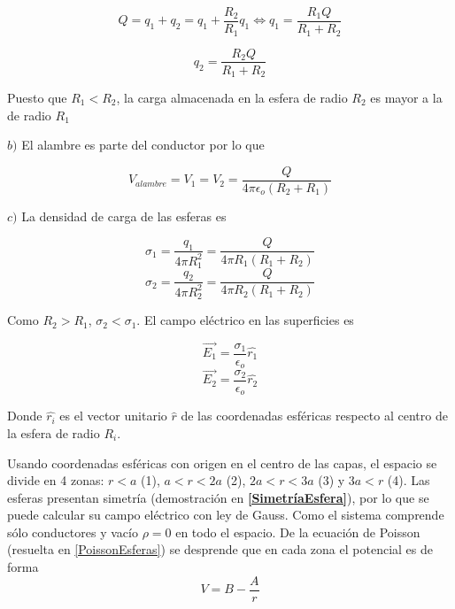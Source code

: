 \[Q = q_1 + q_2 = q_1 + \frac{R_2}{R_1}q_1 \Leftrightarrow
q_1 = \frac{R_1 Q}{R_1+R_2}\]

\[q_2 = \frac{R_2 Q}{R_1+R_2}\]

Puesto que $R_1<R_2$, la carga almacenada en la esfera de radio $R_2$ es mayor a la de radio $R_1$

\bigbreak

$b)$ El alambre es parte del conductor por lo que

\[V_{alambre} = V_1 = V_2 = \frac{Q}{4\pi\epsilon_o(R_2+R_1)}\]
\bigbreak

$c)$ La densidad de carga de las esferas es

\[\sigma_1 = \frac{q_1}{4\pi R_1^2} =
\frac{Q}{4\pi R_1(R_1+R_2)}\]
\[\sigma_2 = \frac{q_2}{4\pi R_2^2} =
\frac{Q}{4\pi R_2(R_1+R_2)}\]

Como $R_2 > R_1$, $\sigma_2 < \sigma_1$. El campo eléctrico en las superficies es

\[\Vec{E_1}=\frac{\sigma_1}{\epsilon_o}\hat{r_1}\]
\[\Vec{E_2}=\frac{\sigma_2}{\epsilon_o}\hat{r_2}\]

Donde $\hat{r_i}$ es el vector unitario $\hat{r}$ de las coordenadas esféricas respecto al centro de la esfera de radio $R_i$.
\bigbreak
\bigbreak

\newline\newline
 Usando coordenadas esféricas con origen en el centro de las capas, el espacio se divide en 4 zonas: $r < a$ (1), $a<r<2a$ (2), $2a<r<3a$ (3) y $3a<r$ (4). Las esferas presentan simetría (demostración en \textbf{\ref{SimetríaEsfera}}), por lo que se puede calcular su campo eléctrico con ley de Gauss. Como el sistema comprende sólo conductores y vacío $\rho = 0$ en todo el espacio. De la ecuación de Poisson (resuelta en \ref{PoissonEsferas}) se desprende que en cada zona el potencial es de forma
\[V = B-\frac{A}{r}\]


